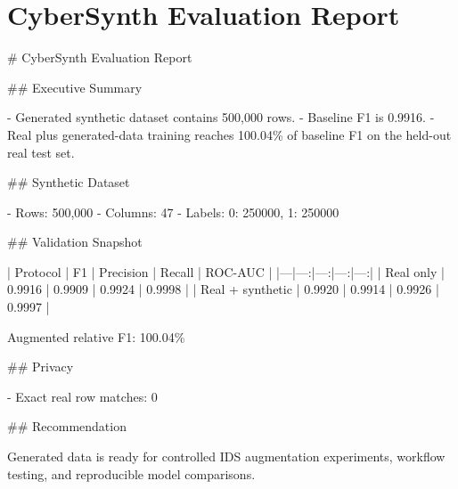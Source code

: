 \documentclass{article}
\begin{document}
\section*{CyberSynth Evaluation Report}
# CyberSynth Evaluation Report

## Executive Summary

- Generated synthetic dataset contains 500,000 rows.
- Baseline F1 is 0.9916.
- Real plus generated-data training reaches 100.04\% of baseline F1 on the held-out real test set.

## Synthetic Dataset

- Rows: 500,000
- Columns: 47
- Labels: {0: 250000, 1: 250000}

## Validation Snapshot

| Protocol | F1 | Precision | Recall | ROC-AUC |
|---|---:|---:|---:|---:|
| Real only | 0.9916 | 0.9909 | 0.9924 | 0.9998 |
| Real + synthetic | 0.9920 | 0.9914 | 0.9926 | 0.9997 |

Augmented relative F1: 100.04\%

## Privacy

- Exact real row matches: 0

## Recommendation

Generated data is ready for controlled IDS augmentation experiments, workflow testing, and reproducible model comparisons.
\end{document}

